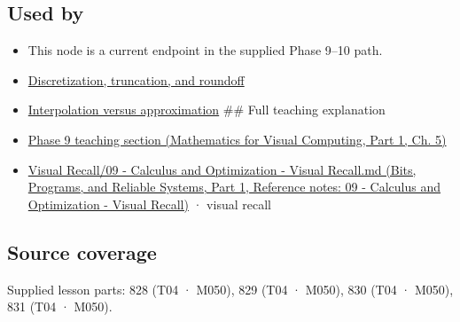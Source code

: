 \subsection{Used by}\label{appendix-32f39e9a3738-used-by}

\hypertarget{appendix-32f39e9a3738-used-by}{}

\begin{itemize}
\item
  This node is a current endpoint in the supplied Phase 9--10 path.
\item
  \hyperref[appendix-6b0648b2b8e8]{Discretization, truncation, and roundoff}
\item
  \hyperref[appendix-0c2a5f69851e]{Interpolation versus approximation} \#\# Full teaching explanation
\item
  \href{../02-Mathematics-for-Visual-Computing-P01/main.pdf\#nameddest=02-foundations-ii-ch021-jacobians-curvature-and-local-approximation}{Phase 9 teaching section (Mathematics for Visual Computing, Part 1, Ch. 5)}
\item
  \href{../01-Bits-Programs-and-Reliable-Systems-P01/main.pdf\#nameddest=appendix-adf48f5dc5c1}{Visual Recall/09 - Calculus and Optimization - Visual Recall.md (Bits, Programs, and Reliable Systems, Part 1, Reference notes: 09 - Calculus and Optimization - Visual Recall)} · visual recall
\end{itemize}

\subsection{Source coverage}\label{appendix-32f39e9a3738-source-coverage}

\hypertarget{appendix-32f39e9a3738-source-coverage}{}

Supplied lesson parts: 828 (T04 · M050), 829 (T04 · M050), 830 (T04 · M050), 831 (T04 · M050).

